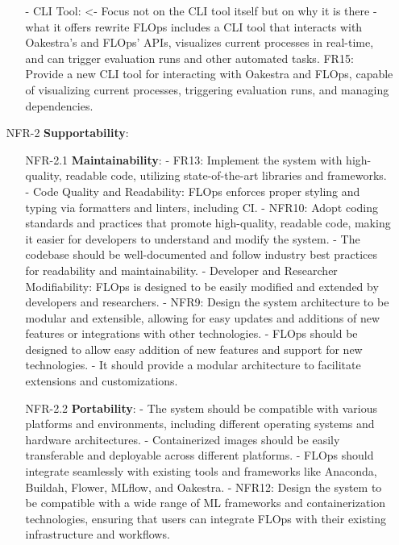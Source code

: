 \begin{itemize}
\begin{itemize}
            - CLI Tool: <- Focus not on the CLI tool itself but on why it is there - what it offers rewrite
                FLOps includes a CLI tool that interacts with Oakestra’s and FLOps’ APIs, visualizes current processes in real-time, and can trigger evaluation runs and other automated tasks.
                FR15: Provide a new CLI tool for interacting with Oakestra and FLOps, capable of visualizing current processes, triggering evaluation runs, and managing dependencies.
        \end{itemize}
    \item [NFR-2] {\textbf{Supportability}}:
        \begin{itemize}
        \item [NFR-2.1] {\textbf{Maintainability}}:
            - FR13: Implement the system with high-quality, readable code, utilizing state-of-the-art libraries and frameworks.
            - Code Quality and Readability:
                FLOps enforces proper styling and typing via formatters and linters, including CI.    
            - NFR10: Adopt coding standards and practices that promote high-quality, readable code, making it easier for developers to understand and modify the system.
            - The codebase should be well-documented and follow industry best practices for readability and maintainability.
            - Developer and Researcher Modifiability:
                FLOps is designed to be easily modified and extended by developers and researchers.
            - NFR9: Design the system architecture to be modular and extensible, allowing for easy updates and additions of new features or integrations with other technologies.
            - FLOps should be designed to allow easy addition of new features and support for new technologies.
            - It should provide a modular architecture to facilitate extensions and customizations.
        \item [NFR-2.2] {\textbf{Portability}}:
            - The system should be compatible with various platforms and environments, including different operating systems and hardware architectures.
            - Containerized images should be easily transferable and deployable across different platforms.
            - FLOps should integrate seamlessly with existing tools and frameworks like Anaconda, Buildah, Flower, MLflow, and Oakestra.
            - NFR12: Design the system to be compatible with a wide range of ML frameworks and containerization technologies, ensuring that users can integrate FLOps with their existing infrastructure and workflows.

\end{itemize}
\end{itemize}
